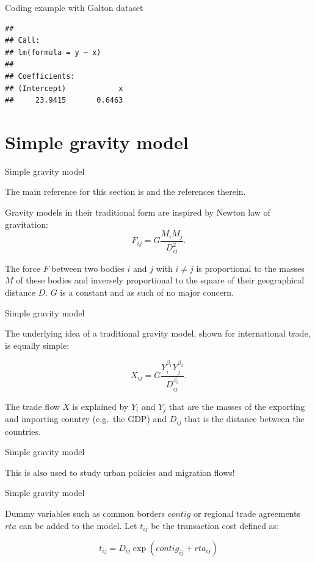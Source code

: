 \documentclass[ignorenonframetext,compress,aspectratio=169]{beamer}
\begin{document}
\begin{frame}[fragile]{Coding example with Galton dataset}

\begin{verbatim}
## 
## Call:
## lm(formula = y ~ x)
## 
## Coefficients:
## (Intercept)            x  
##     23.9415       0.6463
\end{verbatim}

\end{frame}

\section{Simple gravity model}\label{simple-gravity-model}

\begin{frame}{Simple gravity model}

The main reference for this section is \citet{Woelver2018} and the
references therein.

Gravity models in their traditional form are inspired by Newton law of
gravitation: \[
F_{ij}=G\frac{M_{i}M_{j}}{D^{2}_{ij}}.
\]

The force \(F\) between two bodies \(i\) and \(j\) with \(i \neq j\) is
proportional to the masses \(M\) of these bodies and inversely
proportional to the square of their geographical distance \(D\). \(G\)
is a constant and as such of no major concern.

\end{frame}

\begin{frame}{Simple gravity model}

The underlying idea of a traditional gravity model, shown for
international trade, is equally simple:

\[
X_{ij}=G\frac{Y_{i}^{\beta_{1}}Y_{j}^{\beta_{2}}}{D_{ij}^{\beta_{3}}}.
\]

The trade flow \(X\) is explained by \(Y_{i}\) and \(Y_{j}\) that are
the masses of the exporting and importing country (e.g.~the GDP) and
\(D_{ij}\) that is the distance between the countries.

\end{frame}

\begin{frame}{Simple gravity model}

\LARGE{This is also used to study urban policies and migration flows!}

\end{frame}

\begin{frame}{Simple gravity model}

Dummy variables such as common borders \(contig\) or regional trade
agreements \(rta\) can be added to the model. Let \(t_{ij}\) be the
transaction cost defined as:

\[
t_{ij}= D_{ij} \exp(contig_{ij} + rta_{ij})
\]

\end{frame}
\end{document}
